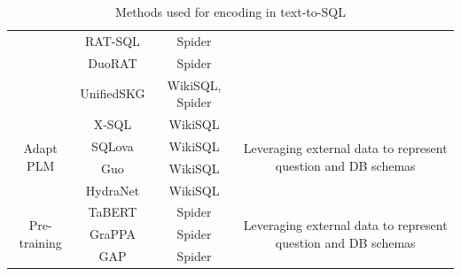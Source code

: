 \begin{table}[H]
\begin{tabular}{|c|c|c|c|}
                                        & RAT-SQL             & Spider                    &                                                                                                            \\
                                        & DuoRAT              & Spider                    &                                                                                                            \\
                                        & UnifiedSKG          & WikiSQL, Spider           &                                                                                                            \\
        \hline
        \multirow{4}{*}{Adapt PLM}      & X-SQL               & WikiSQL                   & \multirow{4}{*}{\parbox{5cm}{Leveraging external data to represent question and DB schemas}}               \\
                                        & SQLova              & WikiSQL                   &                                                                                                            \\
                                        & Guo                 & WikiSQL                   &                                                                                                            \\
                                        & HydraNet            & WikiSQL                   &                                                                                                            \\
        \hline
        \multirow{3}{*}{Pre-training}   & TaBERT              & Spider                    & \multirow{3}{*}{\parbox{5cm}{Leveraging external data to represent question and DB schemas}}               \\
                                        & GraPPA              & Spider                    &                                                                                                            \\
                                        & GAP                 & Spider                    &                                                                                                            \\
        \hline
    \end{tabular}
    \caption{Methods used for encoding in text-to-SQL \cite{deng2022recent}}
    \label{tab:methods}
\end{table}








